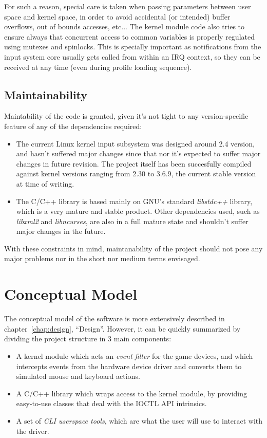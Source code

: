 For such a reason, special care is taken when passing parameters between user space and kernel space, in order to avoid accidental (or intended) buffer overflows, out of bounds accesses, etc... The kernel module code also tries to ensure always that concurrent access to common variables is properly regulated using mutexes and spinlocks. This is specially important as notifications from the input system core usually gets called from within an IRQ context, so they can be received at any time (even during profile loading sequence).

\subsection{Maintainability}
Maintability of the code is granted, given it's not tight to any version-specific feature of any of the dependencies required:
 \begin{itemize}
  \item The current Linux kernel input subsystem was designed around 2.4 version, and hasn't suffered major changes since that nor it's expected to suffer major changes in future revision. The project itself has been succesfully compiled against kernel versions ranging from 2.30 to 3.6.9, the current stable version at time of writing.
  \item The C/C++ library is based mainly on GNU's standard \emph{libstdc++} library, which is a very mature and stable product. Other dependencies used, such as \emph{libxml2} and \emph{libncurses}, are also in a full mature state and shouldn't suffer  major changes in the future.
 \end{itemize}

With these constraints in mind, maintanability of the project should not pose any major problems nor in the short nor medium terms envisaged.
 

\section{Conceptual Model} 
The conceptual model of the software is more extensively described in chapter~\ref{chap:design}, ``Design''. However, it can be quickly summarized by dividing the project structure in 3 main components:
\begin{itemize}
 \item A kernel module which acts an \emph{event filter} for the game devices, and which intercepts events from the hardware device driver and converts them to simulated mouse and keyboard actions.
 \item A C/C++ library which wraps access to the kernel module, by providing easy-to-use classes that deal with the IOCTL API intrinsics.
 \item A set of \emph{CLI userspace tools}, which are what the user will use to interact with the driver.
\end{itemize}

